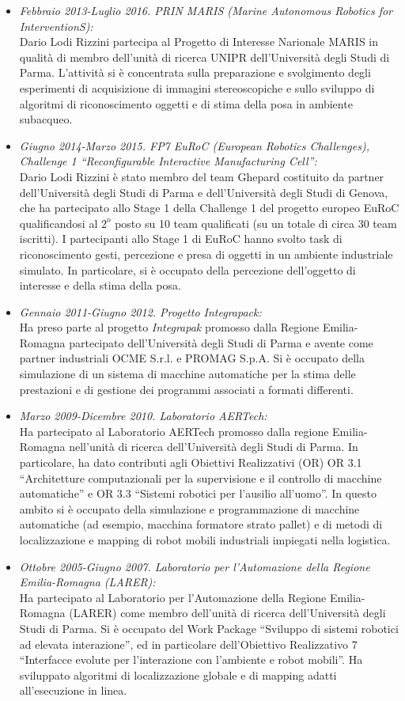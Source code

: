 \documentclass[11pt]{article}
\newcommand{\ITEMDATE}[1]{\item \textit{#1:}\\}
\begin{document}
\begin{itemize}

\ITEMDATE{Febbraio 2013-Luglio 2016. PRIN MARIS (Marine Autonomous Robotics for InterventionS)} 
Dario Lodi Rizzini partecipa al Progetto di Interesse Narionale MARIS in qualit\`a di membro
dell'unit\`a di ricerca UNIPR dell'Universit\`a degli Studi di Parma. 
L'attivit\`a si \`e concentrata sulla preparazione e svolgimento degli esperimenti
di acquisizione di immagini stereoscopiche e sullo sviluppo di algoritmi di riconoscimento 
oggetti e di stima della posa in ambiente subacqueo.

\ITEMDATE{Giugno 2014-Marzo 2015. FP7 EuRoC (European Robotics Challenges), \\
           Challenge 1 ``Reconfigurable Interactive Manufacturing Cell''} 
Dario Lodi Rizzini \`e stato membro del team Ghepard costituito da partner dell'Universit\`a degli 
Studi di Parma e dell'Universit\`a degli Studi di Genova, che ha partecipato allo Stage 1 della 
Challenge 1 del progetto europeo EuRoC qualificandosi al $2^o$ posto su 10 team qualificati 
(su un totale di circa 30 team iscritti).
I partecipanti allo Stage 1 di EuRoC hanno svolto task di riconoscimento gesti, percezione e presa 
di oggetti in un ambiente industriale simulato. 
In particolare, si \`e occupato della percezione dell'oggetto di interesse e della stima della posa.

\ITEMDATE{Gennaio 2011-Giugno 2012. Progetto Integrapack} 
Ha preso parte al progetto \emph{Integrapak} promosso dalla Regione Emilia-Romagna partecipato 
dell'Universit\`a degli Studi di Parma
e avente come partner industriali OCME S.r.l. e PROMAG S.p.A.
Si \`e occupato della simulazione di un sistema di macchine automatiche per la stima delle prestazioni
e di gestione dei programmi associati a formati differenti. 

\ITEMDATE{Marzo 2009-Dicembre 2010. Laboratorio AERTech}
Ha partecipato al Laboratorio AERTech promosso dalla regione Emilia-Romagna nell'unit\`a di ricerca
dell'Universit\`a degli Studi di Parma.
In particolare, ha dato contributi agli Obiettivi Realizzativi (OR)
OR 3.1 ``Architetture computazionali per la supervisione e il controllo di macchine automatiche'' e
OR 3.3 ``Sistemi robotici per l'ausilio all'uomo''.
In questo ambito si \`e occupato della simulazione e programmazione di macchine automatiche 
(ad esempio, macchina formatore strato pallet) e di metodi di localizzazione e mapping 
di robot mobili industriali impiegati nella logistica. 

\ITEMDATE{Ottobre 2005-Giugno 2007. Laboratorio per l'Automazione della Regione Emilia-Romagna (LARER)}
Ha partecipato al Laboratorio per l'Automazione della Regione Emilia-Romagna (LARER) 
come membro dell'unit\`a di ricerca dell'Universit\`a degli Studi di Parma.
Si \`e occupato del Work Package ``Sviluppo di sistemi robotici ad elevata interazione'',
ed in particolare dell'Obiettivo Realizzativo 7 ``Interfacce evolute per l'interazione con l'ambiente e robot mobili''.
Ha sviluppato algoritmi di localizzazione globale e di mapping adatti all'esecuzione in linea.

\end{itemize}
\end{document}

